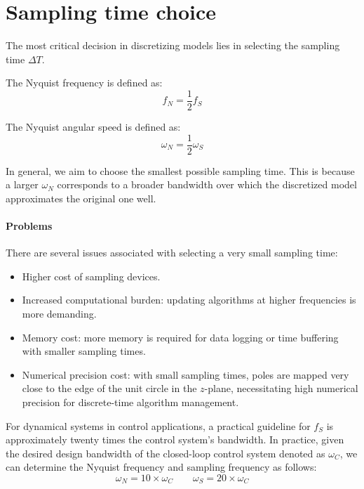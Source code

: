 \section{Sampling time choice}

The most critical decision in discretizing models lies in selecting the sampling time $\Delta T$. 
\begin{definition}
    The Nyquist frequency is defined as:
    \[f_N=\dfrac{1}{2}f_S\]
\end{definition}
\begin{definition}
    The Nyquist angular speed is defined as:
    \[\omega_N=\dfrac{1}{2}\omega_S\]
\end{definition}
In general, we aim to choose the smallest possible sampling time. 
This is because a larger $\omega_N$ corresponds to a broader bandwidth over which the discretized model approximates the original one well.

\paragraph*{Problems}
There are several issues associated with selecting a very small sampling time:
\begin{itemize}
    \item Higher cost of sampling devices.
    \item Increased computational burden: updating algorithms at higher frequencies is more demanding.
    \item Memory cost: more memory is required for data logging or time buffering with smaller sampling times.
    \item Numerical precision cost: with small sampling times, poles are mapped very close to the edge of the unit circle in the $z$-plane, necessitating high numerical precision for discrete-time algorithm management.
\end{itemize}
For dynamical systems in control applications, a practical guideline for $f_S$ is approximately twenty times the control system's bandwidth.
In practice, given the desired design bandwidth of the closed-loop control system denoted as $\omega_C$, we can determine the Nyquist frequency and sampling frequency as follows:
\[\omega_N=10 \times \omega_C \qquad \omega_S=20 \times \omega_C\]
